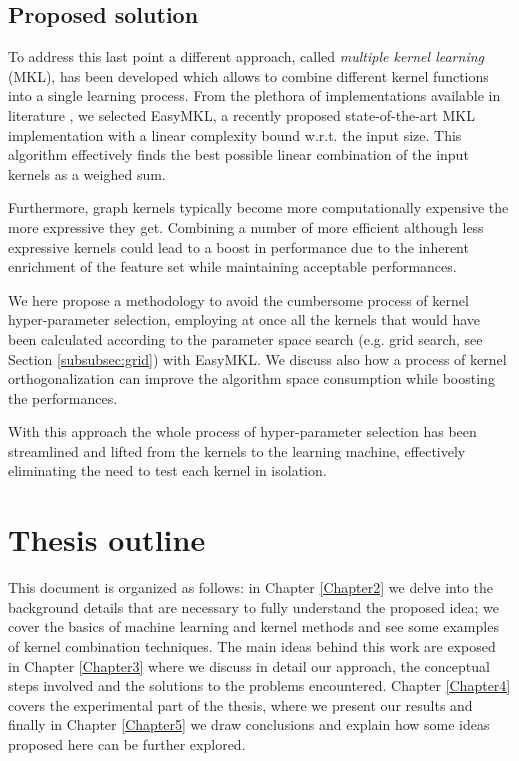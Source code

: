 \subsection{Proposed solution}

To address this last point a different approach, called \emph{multiple kernel learning} (MKL),
has been developed which allows to combine different kernel functions into a single learning process.
From the plethora of implementations available in literature \cite{journals/jmlr/GonenA11},
we selected EasyMKL, a recently proposed state-of-the-art MKL implementation
\cite{aiolli2015easymkl} with a linear complexity bound w.r.t. the input size.
This algorithm effectively finds the best possible linear combination of the
input kernels as a weighed sum.

Furthermore, graph kernels typically become more computationally expensive the
more expressive they get.
Combining a number of more efficient although less expressive kernels could
lead to a boost in performance due to the inherent enrichment of the feature set
while maintaining acceptable performances.

We here propose a methodology to avoid the cumbersome process of kernel
hyper-parameter selection, employing at once all the kernels that would have been calculated
according to the parameter space search (e.g. grid search, see Section \ref{subsubsec:grid})
with EasyMKL.
We discuss also how a process of kernel orthogonalization can improve the algorithm space
consumption while boosting the performances.

With this approach the whole process of hyper-parameter selection has been streamlined and
lifted from the kernels to the learning machine, effectively eliminating the need to test each
kernel in isolation.


\section{Thesis outline}
This document is organized as follows: in Chapter \ref{Chapter2} we delve into
the background details that are necessary to fully understand the proposed idea;
we cover the basics of machine learning and kernel methods and see some examples
of kernel combination techniques.
The main ideas behind this work are exposed in Chapter \ref{Chapter3} where we
discuss in detail our approach, the conceptual steps involved and the solutions
to the problems encountered.
Chapter \ref{Chapter4} covers the experimental part of the thesis, where we present
our results and finally in Chapter \ref{Chapter5} we draw conclusions and explain
how some ideas proposed here can be further explored.


